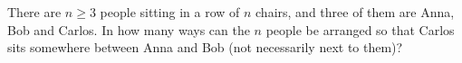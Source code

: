 There are $n\ge3$ people sitting in a row of $n$ chairs, and three of them are Anna, Bob and Carlos. In how many ways can the $n$ people be arranged so that Carlos sits somewhere between Anna and Bob (not necessarily next to them)?
